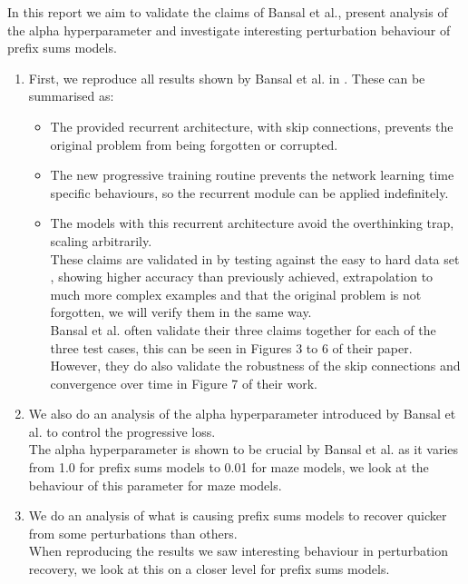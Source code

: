 In this report we aim to validate the claims of Bansal et al., present analysis of the alpha hyperparameter and investigate interesting perturbation behaviour of prefix sums models.
\begin{enumerate}
    \item First, we reproduce all results shown by Bansal et al. in \cite{bansal2022endtoend}. These can be summarised as:
        \begin{itemize}
            \item The provided recurrent architecture, with skip connections, prevents the original problem from being forgotten or corrupted.
            \item The new progressive training routine prevents the network learning time specific behaviours, so the recurrent module can be applied indefinitely.
            \item The models with this recurrent architecture avoid the overthinking trap, scaling arbitrarily.\\\newline
            These claims are validated in \cite{bansal2022endtoend} by testing against the easy to hard data set \cite{Schwarzschild2021datasets}, showing higher accuracy than previously achieved, extrapolation to much more complex examples and that the original problem is not forgotten, we will verify them in the same way.\\Bansal et al. often validate their three claims together for each of the three test cases, this can be seen in Figures 3 to 6 of their paper. However, they do also validate the robustness of the skip connections and convergence over time in Figure 7 of their work.
        \end{itemize}
    \item We also do an analysis of the alpha hyperparameter introduced by Bansal et al. to control the progressive loss.\\
    The alpha hyperparameter is shown to be crucial by Bansal et al. as it varies from 1.0 for prefix sums models to 0.01 for maze models, we look at the behaviour of this parameter for maze models.
    \item We do an analysis of what is causing prefix sums models to recover quicker from some perturbations than others.\\
    When reproducing the results we saw interesting behaviour in perturbation recovery, we look at this on a closer level for prefix sums models.
\end{enumerate}

